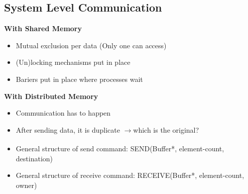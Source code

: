 \documentclass[a4paper]{article}
\newcommand{\arrow}{$\xrightarrow[]{}$}
\begin{document}
\subsection{System Level Communication}
{\bf With Shared Memory}
	\begin{itemize}
	\setlength{\itemsep}{-4pt}
	\item Mutual exclusion per data (Only one can access)
	\item (Un)locking mechanisms put in place
	\item Bariers put in place where processes wait
	\end{itemize}
{\bf With Distributed Memory}
	\begin{itemize}
	\setlength{\itemsep}{-4pt}
	\item Communication has to happen
	\item After sending data, it is duplicate \arrow which is the original?
	\item General structure of send command: SEND(Buffer*, element-count, destination)
	\item General structure of receive command: RECEIVE(Buffer*, element-count, owner)
	\end{itemize}
\end{document}
